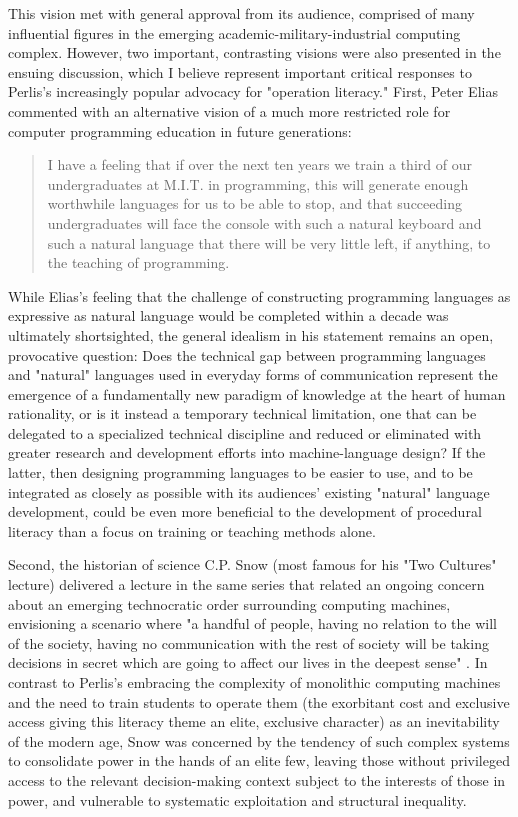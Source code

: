 This vision met with general approval from its audience, comprised of many influential figures in the emerging academic-military-industrial computing complex. However, two important, contrasting visions were also presented in the ensuing discussion, which I believe represent important critical responses to Perlis's increasingly popular advocacy for "operation literacy." First, Peter Elias commented with an alternative vision of a much more restricted role for computer programming education in future generations:
\blockcquote[qtd.~in][203]{Perlis62}{
  I have a feeling that if over the next ten years we train a third of our undergraduates at M.I.T. in programming, this will generate enough worthwhile languages for us to be able to stop, and that succeeding undergraduates will face the console with such a natural keyboard and such a natural language that there will be very little left, if anything, to the teaching of programming.
}
While Elias's feeling that the challenge of constructing programming languages as expressive as natural language would be completed within a decade was ultimately shortsighted, the general idealism in his statement remains an open, provocative question: Does the technical gap between programming languages and "natural" languages used in everyday forms of communication represent the emergence of a fundamentally new paradigm of knowledge at the heart of human rationality, or is it instead a temporary technical limitation, one that can be delegated to a specialized technical discipline and reduced or eliminated with greater research and development efforts into machine-language design? If the latter, then designing programming languages to be easier to use, and to be integrated as closely as possible with its audiences' existing "natural" language development, could be even more beneficial to the development of procedural literacy than a focus on training or teaching methods alone.

Second, the historian of science C.P. Snow (most famous for his "Two Cultures" lecture) delivered a lecture in the same series that related an ongoing concern about an emerging technocratic order surrounding computing machines, envisioning a scenario where "a handful of people, having no relation to the will of the society, having no communication with the rest of society will be taking decisions in secret which are going to affect our lives in the deepest sense" \autocite*[9]{Snow62}. In contrast to Perlis's embracing the complexity of monolithic computing machines and the need to train students to operate them (the exorbitant cost and exclusive access giving this literacy theme an elite, exclusive character) as an inevitability of the modern age, Snow was concerned by the tendency of such complex systems to consolidate power in the hands of an elite few, leaving those without privileged access to the relevant decision-making context subject to the interests of those in power, and vulnerable to systematic exploitation and structural inequality.

